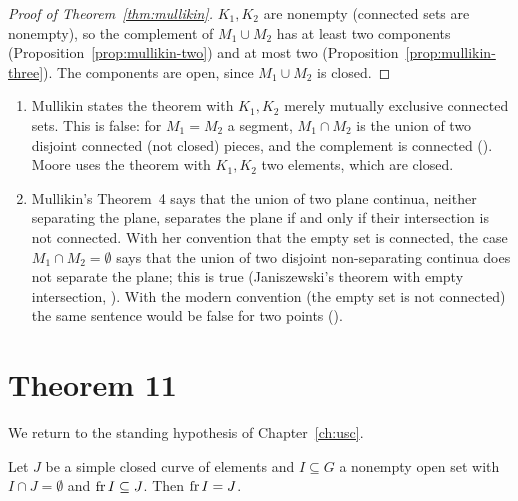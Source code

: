
\begin{proof}[Proof of Theorem~\ref{thm:mullikin}]
$K_1,K_2$ are nonempty (connected sets are nonempty), so the complement of $M_1\cup M_2$ has at least
two components (Proposition~\ref{prop:mullikin-two}) and at most two
(Proposition~\ref{prop:mullikin-three}). The components are open, since $M_1\cup M_2$ is closed.
\end{proof}


\begin{remark}\label{rem:mullikin-printed}
\leavevmode
\begin{enumerate}
\item Mullikin states the theorem with $K_1,K_2$ merely mutually exclusive connected sets. This is
false: for $M_1=M_2$ a segment, $M_1\cap M_2$ is the union of two disjoint connected (not closed)
pieces, and the complement is connected (). Moore uses
the theorem with $K_1,K_2$ two elements, which are closed.
\item Mullikin's Theorem~4 says that the union of two plane continua, neither separating the plane,
separates the plane if and only if their intersection is not connected. With her convention that the
empty set is connected, the case $M_1\cap M_2=\emptyset$ says that the union of two disjoint
non-separating continua does not separate the plane; this is true (Janiszewski's theorem with empty
intersection, ). With the modern convention (the empty set
is not connected) the same sentence would be false for two points
().
\end{enumerate}
\end{remark}

\section{Theorem 11}

We return to the standing hypothesis of Chapter~\ref{ch:usc}.

\begin{lemma}\label{lem:frontier-scc}
Let $J$ be a simple closed curve of elements and $I\subseteq G$ a nonempty open set with $I\cap
J=\emptyset$ and $\operatorname{fr} I\subseteq J$. Then $\operatorname{fr} I=J$.
\end{lemma}

